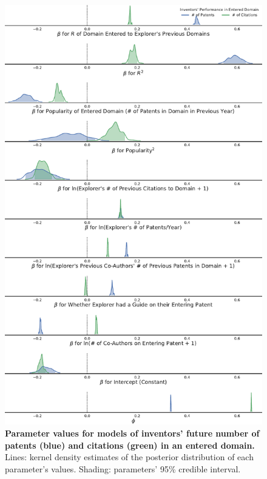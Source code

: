 \documentclass{dsj}
\begin{document}
\begin{figure}
\begin{center}
\includegraphics[width=1.05\textwidth]{figs/counts_model_parameters.pdf} 
\end{center}
\caption{\textbf{Parameter values for models of inventors' future number of patents (blue) and citations (green) in an entered domain.} Lines: kernel density estimates of the posterior distribution of each parameter's values. Shading: parameters' 95\% credible interval.}\label{count_model_parameters}
\end{figure}
\end{document}

